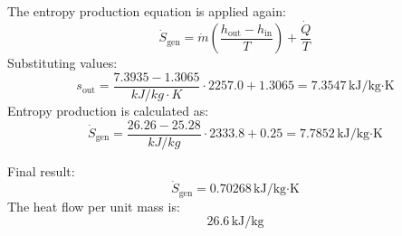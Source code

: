 The entropy production equation is applied again:  
\[
\dot{S}_{\text{gen}} = \dot{m} \left( \frac{h_{\text{out}} - h_{\text{in}}}{T} \right) + \frac{\dot{Q}}{T}
\]  
Substituting values:  
\[
s_{\text{out}} = \frac{7.3935 - 1.3065}{kJ/kg·K} \cdot 2257.0 + 1.3065 = 7.3547 \, \text{kJ/kg·K}
\]  
Entropy production is calculated as:  
\[
\dot{S}_{\text{gen}} = \frac{26.26 - 25.28}{kJ/kg} \cdot 2333.8 + 0.25 = 7.7852 \, \text{kJ/kg·K}
\]  

Final result:  
\[
\dot{S}_{\text{gen}} = 0.70268 \, \text{kJ/kg·K}
\]  
The heat flow per unit mass is:  
\[
26.6 \, \text{kJ/kg}
\]
